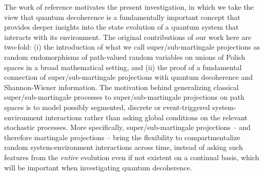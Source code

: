 \documentclass[12pt,a4paper]{article}
\begin{document}
The work of reference \cite{Brody Hughston 2025} motivates the present investigation, in which we take the view that quantum decoherence is a fundamentally important concept that provides deeper insights into the state evolution of a quantum system that interacts with its environment. The original contributions of our work here are two-fold: (i) the introduction of what we call super/sub-martingale projections as random endomorphisms of path-valued random variables on unions of Polish spaces in a broad mathematical setting, and (ii) the proof of a fundamental connection of super/sub-martingale projections with quantum decoherence and Shannon-Wiener information. The motivation behind generalizing classical super/sub-martingale processes to super/sub-martingale projections on path spaces is to model possibly segmented, discrete or event-triggered system-environment interactions rather than asking global conditions on the relevant stochastic processes. More specifically, super/sub-martingale projections -- and therefore martingale projections -- bring the flexibility to compartmentalize random system-environment interactions across time, instead of asking such features from the \emph{entire} evolution even if not existent on a continual basis, which will be important when investigating quantum decoherence.
\end{document}
